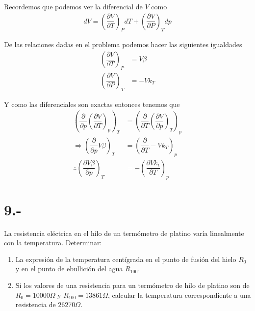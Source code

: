 \documentclass{article}
\newcommand{\pr}[1]{\left(#1\right)}
\newcommand{\pt}[2]{\dfrac{\partial #1}{\partial #2}}
\begin{document}
\begin{tcolorbox}[breakable]
Recordemos que podemos ver la diferencial de $V$ como
\begin{align*}
    dV=\pr{\pt{V}{T}}_PdT+\pr{\pt{V}{P}}_Tdp
\end{align*}

De las relaciones dadas en el problema podemos hacer las siguientes igualdades
\begin{align*}
    \pr{\pt{V}{T}}_P&=V\beta \\
    \pr{\pt{V}{P}}_T&=-Vk_T
\end{align*}

Y como las diferenciales son exactas entonces tenemos que 
\begin{align*}
    \pr{\pt{}{p}\pr{\pt{V}{T}}_p}_T&=\pr{\pt{}{T}\pr{\pt{V}{p}}_T}_p\\
    \Rightarrow \pr{\pt{}{p}V\beta}_T&=\pr{\pt{}{T}-Vk_T}_p\\
    \therefore \pr{\pt{V\beta}{p}}_T&=-\pr{\pt{Vk_t}{T}}_p
\end{align*}

\end{tcolorbox}
\section*{9.-} 
La resistencia eléctrica en el hilo de un termómetro de platino varía linealmente con
la temperatura. Determinar:
\begin{enumerate}
    \item La expresión de la temperatura centígrada en el punto de fusión del hielo 
    $R_0$ y en el punto de ebullición del agua $R_{100}$. 
    
    \item Si los valores de una resistencia para un termómetro de hilo de platino son de 
    $R_0 = 10000 \Omega$ y $R_{100} = 13861 \Omega$, calcular la temperatura correspondiente 
    a una resistencia de $26270 \Omega$. 
\end{enumerate}
\end{document}
